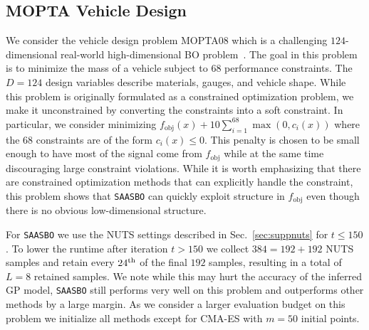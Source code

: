 \documentclass[accepted]{uai2021} %
\newcommand{\fobj}{f_{\text{obj}}}
\newcommand{\algoname}{{\texttt {SAASBO}}}
\begin{document}
\subsection{MOPTA Vehicle Design}
We consider the vehicle design problem MOPTA08 which is a challenging $124$-dimensional real-world high-dimensional BO problem~\citep{jones2008large}.
The goal in this problem is to minimize the mass of a vehicle subject to $68$ performance constraints.
The $D=124$ design variables describe materials, gauges, and vehicle shape.
While this problem is originally formulated as a constrained optimization problem, we make it unconstrained by converting the constraints into a soft constraint.
In particular, we consider minimizing ${\fobj(x) + 10 \sum_{i=1}^{68} \max(0, c_i(x))}$ where the $68$ constraints are of the form $c_i(x) \leq 0$.
This penalty is chosen to be small enough to have most of the signal come from $\fobj$ while at the same time discouraging large constraint violations.
While it is worth emphasizing that there are constrained optimization methods that can explicitly handle the constraint, this problem shows that \algoname{} can quickly exploit structure in $\fobj$ even though there is no obvious low-dimensional structure.

For \algoname{} we use the NUTS settings described in Sec.~\ref{sec:suppnuts} for $t\le150$.
To lower the runtime after iteration $t>150$ we collect $384=192+192$ NUTS samples and retain every $24^{\rm th}$ of the final $192$ samples, resulting in a total of $L=8$ retained samples.
We note while this may hurt the accuracy of the inferred GP model, \algoname{} still performs
very well on this problem and outperforms other methods by a large margin.
As we consider a larger evaluation budget on this problem we initialize all methods except for CMA-ES with $m=50$ initial points.
\end{document}
